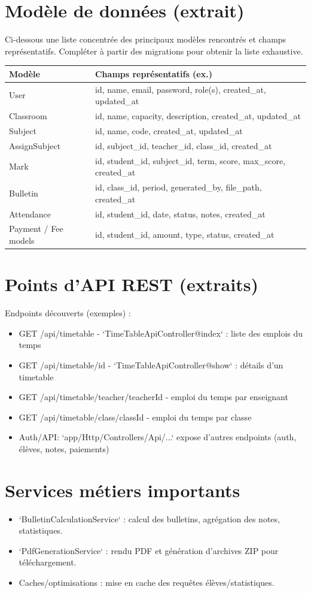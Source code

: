 \documentclass[a4paper,11pt]{article}
\begin{document}
\section{Modèle de données (extrait)}
Ci-dessous une liste concentrée des principaux modèles rencontrés et champs représentatifs. Compléter à partir des migrations pour obtenir la liste exhaustive.
\begin{longtable}{p{4cm} p{10cm}}
\textbf{Modèle} & \textbf{Champs représentatifs (ex.)} \\
\hline
User & id, name, email, password, role(s), created_at, updated_at \\
Classroom & id, name, capacity, description, created_at, updated_at \\
Subject & id, name, code, created_at, updated_at \\
AssignSubject & id, subject_id, teacher_id, class_id, created_at \\
Mark & id, student_id, subject_id, term, score, max_score, created_at \\
Bulletin & id, class_id, period, generated_by, file_path, created_at \\
Attendance & id, student_id, date, status, notes, created_at \\
Payment / Fee models & id, student_id, amount, type, status, created_at \\
\end{longtable}

\section{Points d'API REST (extraits)}
Endpoints découverts (exemples) :
\begin{itemize}
  \item GET /api/timetable - `TimeTableApiController@index` : liste des emplois du temps
  \item GET /api/timetable/{id} - `TimeTableApiController@show` : détails d'un timetable
  \item GET /api/timetable/teacher/{teacherId} - emploi du temps par enseignant
  \item GET /api/timetable/class/{classId} - emploi du temps par classe
  \item Auth/API: `app/Http/Controllers/Api/...` expose d'autres endpoints (auth, élèves, notes, paiements)
\end{itemize}

\section{Services métiers importants}
\begin{itemize}
  \item `BulletinCalculationService` : calcul des bulletins, agrégation des notes, statistiques.
  \item `PdfGenerationService` : rendu PDF et génération d'archives ZIP pour téléchargement.
  \item Caches/optimisations : mise en cache des requêtes élèves/statistiques.
\end{itemize}
\end{document}
